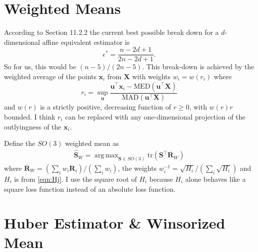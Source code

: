 \documentclass{article}\usepackage[]{graphicx}\usepackage[]{color}
\DeclareMathOperator*{\argmax}{arg\,max}
\newcommand{\WeightMean}{{\widehat{\bm S}_W}}
\begin{document}
\section{Weighted Means}

According to \cite{huber2009} Section 11.2.2 the current best possible break down for a $d$-dimensional affine equivalent estimator is
\[
\epsilon^*=\frac{n-2d+1}{2n-2d+1}.
\]
So for us, this would be $(n-5)/(2n-5)$.  This break-down is achieved by the weighted average of the points $\bm x_i$ from $\bm X$ with weights $w_i=w(r_i)$ where
\[
r_i=\sup_{\bm u}\frac{\bm u^\top\bm x_i-\text{MED}(\bm u^\top\bm X)}{\text{MAD}(\bm u^\top\bm X)}
\]
and $w(r)$ is a strictly positive, decreasing function of $r\geq 0$, with $w(r)r$ bounded.  I think $r_i$ can be replaced with any one-dimensional projection of the outlyingness of the $\bm x_i$.  

Define the $SO(3)$ weighted mean as
\begin{align*}
\WeightMean=\argmax_{\bm S\in SO(3)}\text{tr}(\bm S^\top\overline{\bm R}_W)
\end{align*}
where $\overline{\bm R}_W=(\sum_{i}w_i\bm R_i)/(\sum_i w_i)$, the weights $w_i^{-1}=\sqrt{H_i}/(\sum_i \sqrt{H_i})$ and $H_i$ is from \eqref{eqn:Hj}.  I use the square root of $H_i$ because $H_i$ alone behaves like a square loss function instead of an absolute loss function.







\section{Huber Estimator \& Winsorized Mean}
\end{document}
